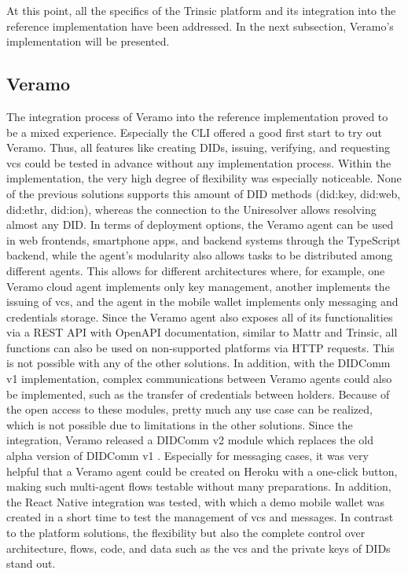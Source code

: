         At this point, all the specifics of the Trinsic platform and its integration into the reference implementation have been addressed. In the next subsection, Veramo's implementation will be presented.
    
        \subsection{Veramo}
        
        The integration process of Veramo into the reference implementation proved to be a mixed experience. Especially the \ac{CLI} offered a good first start to try out Veramo. Thus, all features like creating \acp{DID}, issuing, verifying, and requesting \acp{vc} could be tested in advance without any implementation process. Within the implementation, the very high degree of flexibility was especially noticeable. None of the previous solutions supports this amount of \ac{DID} methods (did:key, did:web, did:ethr, did:ion), whereas the connection to the Uniresolver allows resolving almost any \ac{DID}. In terms of deployment options, the Veramo agent can be used in web frontends, smartphone apps, and backend systems through the TypeScript backend, while the agent's modularity also allows tasks to be distributed among different agents. This allows for different architectures where, for example, one Veramo cloud agent implements only key management, another implements the issuing of \acp{vc}, and the agent in the mobile wallet implements only messaging and credentials storage. Since the Veramo agent also exposes all of its functionalities via a REST API with OpenAPI documentation, similar to Mattr and Trinsic, all functions can also be used on non-supported platforms via HTTP requests. This is not possible with any of the other solutions. In addition, with the DIDComm v1 implementation, complex communications between Veramo agents could also be implemented, such as the transfer of credentials between holders. Because of the open access to these modules, pretty much any use case can be realized, which is not possible due to limitations in the other solutions. Since the integration, Veramo released a DIDComm v2 module which replaces the old alpha version of DIDComm v1 \cite{veramo_blog_2021}.
        Especially for messaging cases, it was very helpful that a Veramo agent could be created on Heroku with a one-click button, making such multi-agent flows testable without many preparations. In addition, the React Native integration was tested, with which a demo mobile wallet was created in a short time to test the management of \acp{vc} and messages. 
        In contrast to the platform solutions, the flexibility but also the complete control over architecture, flows, code, and data such as the \acp{vc} and the private keys of \acp{DID} stand out. 
    

